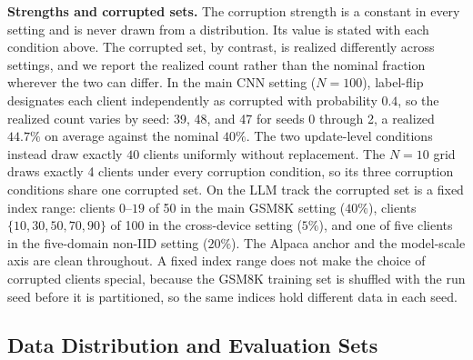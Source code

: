 \documentclass[letterpaper]{article} %
\theoremstyle{plain}
\begin{document}
\textbf{Strengths and corrupted sets.} The corruption strength is a constant
in every setting and is never drawn from a distribution. Its value is stated
with each condition above. The corrupted set, by contrast, is realized
differently across settings, and we report the realized count rather than the
nominal fraction wherever the two can differ. In the main CNN setting
($N{=}100$), label-flip designates each client independently as corrupted with
probability $0.4$, so the realized count varies by seed: 39, 48, and 47
for seeds 0 through 2, a realized $44.7\%$ on average against the nominal
$40\%$. The two update-level conditions instead draw exactly
$40$ clients uniformly without replacement. The $N{=}10$ grid draws
exactly 4 clients under every corruption condition, so its three corruption
conditions share one corrupted set. On the LLM track the corrupted set is a
fixed index range:
clients $0$--$19$ of 50 in the main GSM8K setting ($40\%$), clients
$\{10, 30, 50, 70, 90\}$ of 100 in the cross-device setting ($5\%$), and one
of five clients in the five-domain non-IID setting ($20\%$). The Alpaca anchor
and the model-scale axis are clean throughout. A fixed index range does not
make the choice of corrupted clients special, because the GSM8K training set
is shuffled with the run seed before it is partitioned, so the same indices
hold different data in each seed.

\subsection{Data Distribution and Evaluation Sets}
\label{app:data}
\end{document}
